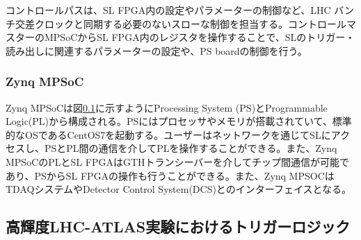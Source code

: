 コントロールパスは、SL FPGA内の設定やパラメーターの制御など、LHC バンチ交差クロックと同期する必要のないスローな制御を担当する。コントロールマスターのMPSoCからSL FPGA内のレジスタを操作することで、SLのトリガー・読み出しに関連するパラメーターの設定や、PS boardの制御を行う。

    \subsubsection*{Zynq MPSoC}
Zynq MPSoCは図\ref{}に示すようにProcessing System (PS)とProgrammable Logic(PL)から構成される。PSにはプロセッサやメモリが搭載されていて、標準的なOSであるCentOS7を起動する。ユーザーはネットワークを通じてSLにアクセスし、PSとPL間の通信を介してPLを操作することができる。また、Zynq MPSoCのPLとSL FPGAはGTHトランシーバーを介してチップ間通信が可能であり、PSからSL FPGAの操作も行うことができる。また、Zynq MPSOCはTDAQシステムやDetector Control System(DCS)とのインターフェイスとなる。

    \subsection{高輝度LHC-ATLAS実験におけるトリガーロジック}